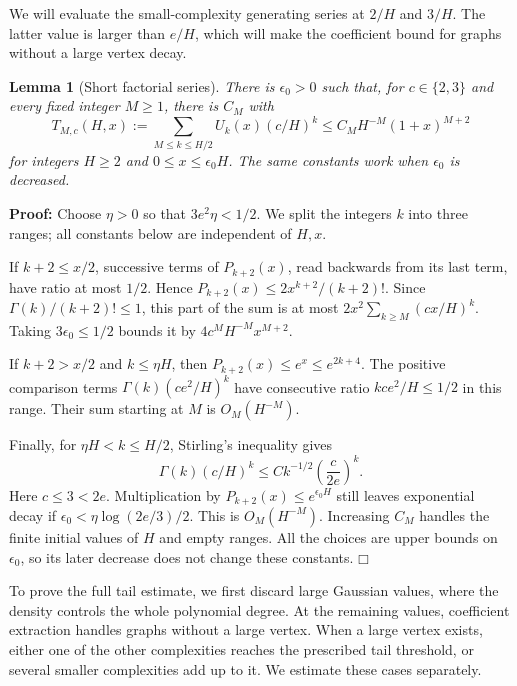 \documentclass[a4paper,10pt]{article}
\numberwithin{equation}{section}
\theoremstyle{paperplain}
\newtheorem{lmm}[thm]{Lemma}
\theoremstyle{paperremark}
\theoremstyle{paperplain}
\newenvironment{prf}{\noindent \textbf{Proof: }}{\hfill $\mdlgwhtsquare$\par\addvspace{0.5\baselineskip}}
\begin{document}
We will evaluate the small-complexity generating series at $2/H$
and $3/H$. The latter value is larger than $e/H$, which will make
the coefficient bound for graphs without a large vertex decay.

\begin{lmm}[Short factorial series]
\label{lmm:s03:short-series}
There is $\epsilon_0>0$ such that, for $c\in\{2,3\}$ and every
fixed integer $M\geq1$, there is $C_M$ with
\begin{equation}
\label{eq:s03:short-series}
T_{M,c}(H,x):=\sum_{M\leq k\leq H/2}U_k(x)(c/H)^k
\leq C_MH^{-M}(1+x)^{M+2}
\end{equation}
for integers $H\geq2$ and $0\leq x\leq\epsilon_0H$.
The same constants work when $\epsilon_0$ is decreased.
\end{lmm}
\begin{prf}
Choose $\eta>0$ so that $3e^2\eta<1/2$. We split the integers $k$
into three ranges; all constants below are independent of $H,x$.

If $k+2\leq x/2$, successive terms of $P_{k+2}(x)$, read backwards
from its last term, have ratio at most $1/2$. Hence
$P_{k+2}(x)\leq2x^{k+2}/(k+2)!$. Since
$\Gamma(k)/(k+2)!\leq1$, this part of the sum is at most
$2x^2\sum_{k\geq M}(cx/H)^k$. Taking $3\epsilon_0\leq1/2$
bounds it by $4c^MH^{-M}x^{M+2}$.

If $k+2>x/2$ and $k\leq\eta H$, then
$P_{k+2}(x)\leq e^x\leq e^{2k+4}$. The positive comparison terms
$\Gamma(k)(ce^2/H)^k$ have consecutive ratio
$kce^2/H\leq1/2$ in this range. Their sum starting at $M$ is
$O_M(H^{-M})$.

Finally, for $\eta H<k\leq H/2$, Stirling's inequality gives
\[
\Gamma(k)(c/H)^k
\leq Ck^{-1/2}\left(\frac{c}{2e}\right)^k.
\]
Here $c\leq3<2e$. Multiplication by
$P_{k+2}(x)\leq e^{\epsilon_0H}$ still leaves exponential decay
if $\epsilon_0<\eta\log(2e/3)/2$. This is $O_M(H^{-M})$.
Increasing $C_M$ handles the finite initial values of $H$ and empty
ranges. All the choices are upper bounds on $\epsilon_0$, so its
later decrease does not change these constants.
\end{prf}

To prove the full tail estimate, we first discard large Gaussian
values, where the density controls the whole polynomial degree.
At the remaining values, coefficient extraction handles graphs
without a large vertex. When a large vertex exists, either one of
the other complexities reaches the prescribed tail threshold,
or several smaller complexities add up to it. We estimate these
cases separately.
\end{document}
